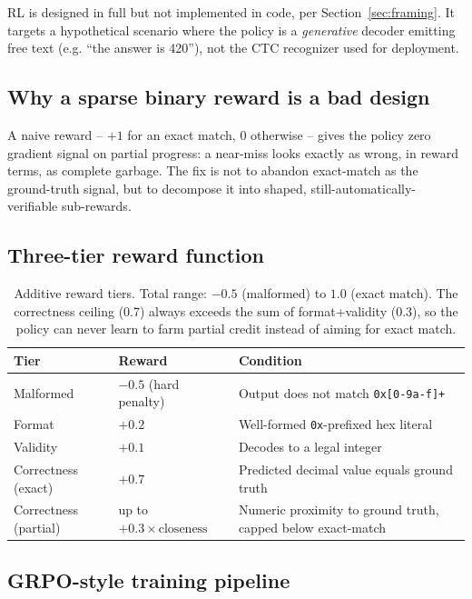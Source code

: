 \documentclass[11pt]{article}
\begin{document}
RL is designed in full but not implemented in code, per Section~\ref{sec:framing}. It
targets a hypothetical scenario where the policy is a \emph{generative} decoder emitting
free text (e.g. ``the answer is 420''), not the CTC recognizer used for deployment.

\subsection{Why a sparse binary reward is a bad design}

A naive reward -- $+1$ for an exact match, $0$ otherwise -- gives the policy zero
gradient signal on partial progress: a near-miss looks exactly as wrong, in reward terms,
as complete garbage. The fix is not to abandon exact-match as the ground-truth signal,
but to decompose it into shaped, still-automatically-verifiable sub-rewards.

\subsection{Three-tier reward function}

\begin{table}[H]
\centering
\begin{tabular}{@{}p{2.6cm}p{3.4cm}p{7.5cm}@{}}
\toprule
\textbf{Tier} & \textbf{Reward} & \textbf{Condition} \\
\midrule
Malformed & $-0.5$ (hard penalty) & Output does not match \texttt{0x[0-9a-f]+} \\
Format & $+0.2$ & Well-formed \texttt{0x}-prefixed hex literal \\
Validity & $+0.1$ & Decodes to a legal integer \\
Correctness (exact) & $+0.7$ & Predicted decimal value equals ground truth \\
Correctness (partial) & up to $+0.3 \times \text{closeness}$ & Numeric proximity to
ground truth, capped below exact-match \\
\bottomrule
\end{tabular}
\caption{Additive reward tiers. Total range: $-0.5$ (malformed) to $1.0$ (exact match).
The correctness ceiling (0.7) always exceeds the sum of format+validity (0.3), so the
policy can never learn to farm partial credit instead of aiming for exact match.}
\end{table}

\subsection{GRPO-style training pipeline}
\end{document}
